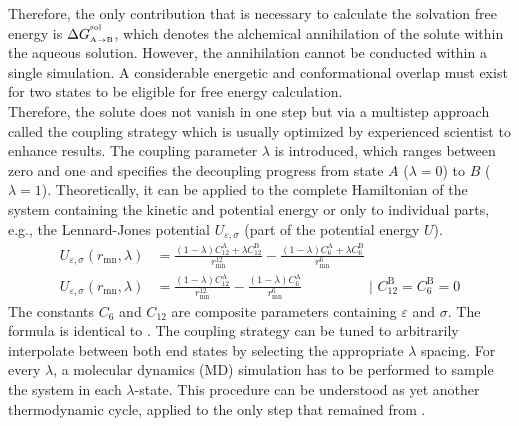 \documentclass[9pt,tutorial]{livecoms}
\begin{document}
Therefore, the only contribution that is necessary to calculate the solvation free energy is $\Delta G_\text{\tiny A$\to$B}^{^\text{sol}}$, which denotes the alchemical annihilation of the solute within the aqueous solution. However, the annihilation cannot be conducted within a single simulation. A considerable energetic and conformational overlap must exist for two states to be eligible for free energy calculation.\\
Therefore, the solute does not vanish in one step but via a multistep approach called the coupling strategy which is usually optimized by experienced scientist to enhance results. The coupling parameter $\lambda$ is introduced, which ranges between zero and one and specifies the decoupling progress from state $A$ ($\lambda=0$) to $B$ ($\lambda=1$). Theoretically, it can be applied to the complete Hamiltonian of the system containing the kinetic and potential energy or only to individual parts, e.g., the Lennard-Jones potential $U_{\varepsilon,\sigma}$ (part of the potential energy $U$).
\begin{align}
    U_{\varepsilon,\sigma}(r_\text{mn}, \lambda) & = \frac{(1-\lambda) C_{12}^\text{A} + \lambda C_{12}^\text{B}}{r_\text{mn}^{12}} - \frac{(1-\lambda) C_{6}^\text{A} + \lambda C_{6}^\text{B}}{r_\text{mn}^{6}} \\\label{eq:ljwithlambda}
    U_{\varepsilon,\sigma}(r_\text{mn}, \lambda) & = \frac{(1-\lambda) C_{12}^\text{A}}{r_\text{mn}^{12}} - \frac{(1-\lambda) C_{6}^\text{A}}{r_\text{mn}^{6}} \hspace{2cm} \Big| \,\, C_{12}^\text{B} = C_{6}^\text{B} = 0
\end{align}
The constants $C_{6}$ and $C_{12}$ are composite parameters containing $\varepsilon$ and $\sigma$. The formula is identical to . The coupling strategy can be tuned to arbitrarily interpolate between both end states by selecting the appropriate $\lambda$ spacing. For every $\lambda$, a molecular dynamics (MD) simulation has to be performed to sample the system in each $\lambda$-state. This procedure can be understood as yet another thermodynamic cycle, applied to the only step that remained from .
\end{document}
